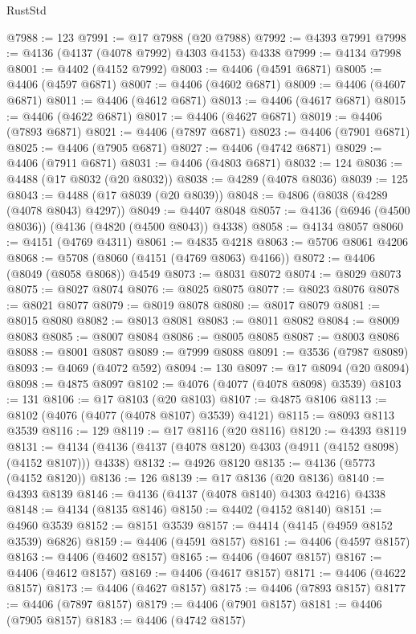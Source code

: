\begin{lexlean}{RustStd}
\begin{coremodule}
@7988 := 123
@7991 := @17 @7988 (@20 @7988)
@7992 := @4393 @7991
@7998 := @4136 (@4137 (@4078 @7992) @4303 @4153) @4338
@7999 := @4134 @7998
@8001 := @4402 (@4152 @7992)
@8003 := @4406 (@4591 @6871)
@8005 := @4406 (@4597 @6871)
@8007 := @4406 (@4602 @6871)
@8009 := @4406 (@4607 @6871)
@8011 := @4406 (@4612 @6871)
@8013 := @4406 (@4617 @6871)
@8015 := @4406 (@4622 @6871)
@8017 := @4406 (@4627 @6871)
@8019 := @4406 (@7893 @6871)
@8021 := @4406 (@7897 @6871)
@8023 := @4406 (@7901 @6871)
@8025 := @4406 (@7905 @6871)
@8027 := @4406 (@4742 @6871)
@8029 := @4406 (@7911 @6871)
@8031 := @4406 (@4803 @6871)
@8032 := 124
@8036 := @4488 (@17 @8032 (@20 @8032))
@8038 := @4289 (@4078 @8036)
@8039 := 125
@8043 := @4488 (@17 @8039 (@20 @8039))
@8048 := @4806 (@8038 (@4289 (@4078 @8043) @4297))
@8049 := @4407 @8048
@8057 := @4136 (@6946 (@4500 @8036)) (@4136 (@4820 (@4500 @8043)) @4338)
@8058 := @4134 @8057
@8060 := @4151 (@4769 @4311)
@8061 := @4835 @4218
@8063 := @5706 @8061 @4206
@8068 := @5708 (@8060 (@4151 (@4769 @8063) @4166))
@8072 := @4406 (@8049 (@8058 @8068)) @4549
@8073 := @8031 @8072
@8074 := @8029 @8073
@8075 := @8027 @8074
@8076 := @8025 @8075
@8077 := @8023 @8076
@8078 := @8021 @8077
@8079 := @8019 @8078
@8080 := @8017 @8079
@8081 := @8015 @8080
@8082 := @8013 @8081
@8083 := @8011 @8082
@8084 := @8009 @8083
@8085 := @8007 @8084
@8086 := @8005 @8085
@8087 := @8003 @8086
@8088 := @8001 @8087
@8089 := @7999 @8088
@8091 := @3536 (@7987 @8089)
@8093 := @4069 (@4072 @592)
@8094 := 130
@8097 := @17 @8094 (@20 @8094)
@8098 := @4875 @8097
@8102 := @4076 (@4077 (@4078 @8098) @3539)
@8103 := 131
@8106 := @17 @8103 (@20 @8103)
@8107 := @4875 @8106
@8113 := @8102 (@4076 (@4077 (@4078 @8107) @3539) @4121)
@8115 := @8093 @8113 @3539
@8116 := 129
@8119 := @17 @8116 (@20 @8116)
@8120 := @4393 @8119
@8131 := @4134 (@4136 (@4137 (@4078 @8120) @4303 (@4911 (@4152 @8098) (@4152 @8107))) @4338)
@8132 := @4926 @8120
@8135 := @4136 (@5773 (@4152 @8120))
@8136 := 126
@8139 := @17 @8136 (@20 @8136)
@8140 := @4393 @8139
@8146 := @4136 (@4137 (@4078 @8140) @4303 @4216) @4338
@8148 := @4134 (@8135 @8146)
@8150 := @4402 (@4152 @8140)
@8151 := @4960 @3539
@8152 := @8151 @3539
@8157 := @4414 (@4145 (@4959 @8152 @3539) @6826)
@8159 := @4406 (@4591 @8157)
@8161 := @4406 (@4597 @8157)
@8163 := @4406 (@4602 @8157)
@8165 := @4406 (@4607 @8157)
@8167 := @4406 (@4612 @8157)
@8169 := @4406 (@4617 @8157)
@8171 := @4406 (@4622 @8157)
@8173 := @4406 (@4627 @8157)
@8175 := @4406 (@7893 @8157)
@8177 := @4406 (@7897 @8157)
@8179 := @4406 (@7901 @8157)
@8181 := @4406 (@7905 @8157)
@8183 := @4406 (@4742 @8157)

\end{coremodule}
\end{lexlean}
